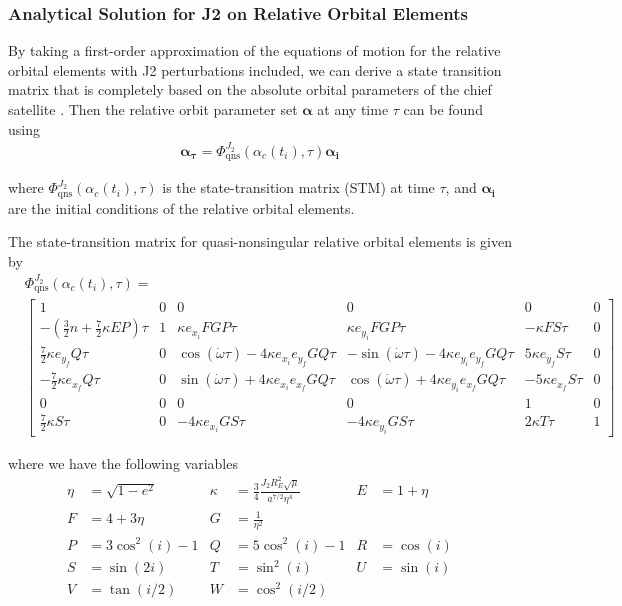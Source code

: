 \subsubsection{Analytical Solution for J2 on Relative Orbital Elements} \label{sec:j2_analytical_roe}

By taking a first-order approximation of the equations of motion for the relative orbital elements with J2 perturbations included, we can derive a state transition matrix that is completely based on the absolute orbital parameters of the chief satellite \cite{koenig2017new}. Then the relative orbit parameter set $\boldsymbol{\alpha}$ at any time $\tau$ can be found using
\begin{align}
    \boldsymbol{\alpha_{\tau}} = \Phi^{J_2}_{\text{qns}}(\alpha_c(t_i), \tau) \boldsymbol{\alpha_{i}} \label{eq:state_transition_relation}
\end{align}

where $\Phi^{J_2}_{\text{qns}}(\alpha_c(t_i), \tau)$ is the state-transition matrix (STM) at time $\tau$, and $\boldsymbol{\alpha_{i}}$ are the initial conditions of the relative orbital elements.

The state-transition matrix for quasi-nonsingular relative orbital elements is given by
\begin{align}
&\Phi^{J_2}_{\text{qns}}(\alpha_c(t_i), \tau) = \nonumber \\ 
&\begin{bmatrix}
1 & 0 & 0 & 0 & 0 & 0 \\
-\left( \frac{3}{2}n + \frac{7}{2} \kappa E P \right)\tau & 1 & \kappa e_{x_i} F G P \tau & \kappa e_{y_i} F G P \tau & -\kappa F S \tau & 0 \\
\frac{7}{2} \kappa e_{y_f} Q \tau & 0 & \cos(\dot{\omega} \tau) - 4\kappa e_{x_i} e_{y_f} G Q \tau & -\sin(\dot{\omega} \tau) - 4\kappa e_{y_i} e_{y_f} G Q \tau & 5\kappa e_{y_f} S \tau & 0 \\
-\frac{7}{2} \kappa e_{x_f} Q \tau & 0 & \sin(\dot{\omega} \tau) + 4\kappa e_{x_i} e_{x_f} G Q \tau & \cos(\dot{\omega} \tau) + 4\kappa e_{y_i} e_{x_f} G Q \tau & -5\kappa e_{x_f} S \tau & 0 \\
0 & 0 & 0 & 0 & 1 & 0 \\
\frac{7}{2} \kappa S \tau & 0 & -4 \kappa e_{x_i} G S \tau & -4 \kappa e_{y_i} G S \tau & 2 \kappa T \tau & 1
\end{bmatrix} \label{eq:stm_matrix}
\end{align}

where we have the following variables
\begin{align*}
\eta &= \sqrt{1 - e^2} &
\kappa &= \frac{3}{4} \frac{J_2 R_E^2 \sqrt{\mu}}{a^{7/2} \eta^4} &
E &= 1 + \eta \\
F &= 4 + 3\eta &
G &= \frac{1}{\eta^2} & \\
P &= 3\cos^2(i) - 1 &
Q &= 5\cos^2(i) - 1 &
R &= \cos(i) \\
S &= \sin(2i) &
T &= \sin^2(i) &
U &= \sin(i) \\
V &= \tan(i/2) &
W &= \cos^2(i/2)
\end{align*} 

